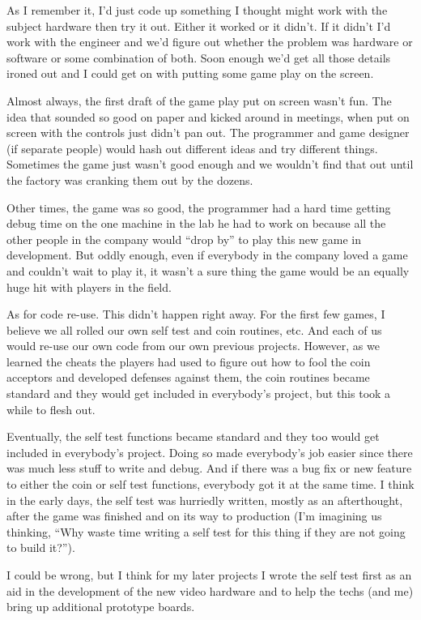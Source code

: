 As I remember it, I'd just code up something I thought might work with the subject hardware then try it out. Either it worked or it didn't. If it didn't I'd work with the engineer and we'd figure out whether the problem was hardware or software or some combination of both. Soon enough we'd get all those details ironed out and I could get on with putting some game play on the screen.

Almost always, the first draft of the game play put on screen wasn't fun. The idea that sounded so good on paper and kicked around in meetings, when put on screen with the controls just didn't pan out. The programmer and game designer (if separate people) would hash out different ideas and try different things. Sometimes the game just wasn't good enough and we wouldn't find that out until the factory was cranking them out by the dozens. 

Other times, the game was so good, the programmer had a hard time getting debug time on the one machine in the lab he had to work on because all the other people in the company would “drop by” to play this new game in development. But oddly enough, even if everybody in the company loved a game and couldn't wait to play it, it wasn't a sure thing the game would be an equally huge hit with players in the field.

As for code re-use. This didn't happen right away. For the first few games, I believe we all rolled our own self test and coin routines, etc. And each of us would re-use our own code from our own previous projects. However, as we learned the cheats the players had used to figure out how to fool the coin acceptors and developed defenses against them, the coin routines became standard and they would get included in everybody's project, but this took a while to flesh out. 

Eventually, the self test functions became standard and they too would get included in everybody's project. Doing so made everybody's job easier since there was much less stuff to write and debug. And if there was a bug fix or new feature to either the coin or self test functions, everybody got it at the same time. I think in the early days, the self test was hurriedly written, mostly as an afterthought, after the game was finished and on its way to production (I'm imagining us thinking, “Why waste time writing a self test for this thing if they are not going to build it?”). 

I could be wrong, but I think for my later projects I wrote the self test first as an aid in the development of the new video hardware and to help the techs (and me) bring up additional prototype boards.

